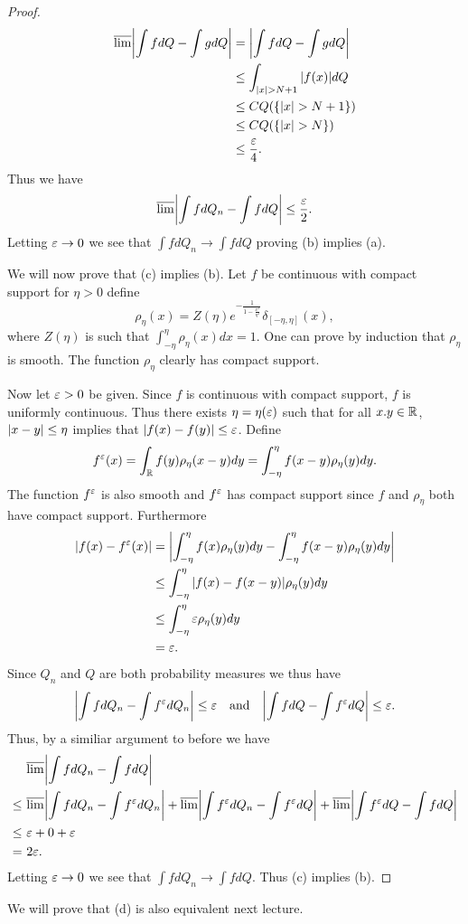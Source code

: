\begin{proof}
\begin{align*}
        \overline{\lim} {\left\lvert\int f dQ - \int g dQ\right\rvert} &= {\left\lvert\int f dQ - \int g dQ\right\rvert}\\
        &\le\int_{{\left\lvert x\right\rvert} > N+1} {\left\lvert f(x)\right\rvert} dQ\\
        &\le C Q(\{{\left\lvert x\right\rvert}>N+1\})\\
        &\le C Q(\{{\left\lvert x\right\rvert}>N\})\\
        &\le \frac{\varepsilon}{4}.
    \end{align*}
    Thus we have 
    \begin{align*}
        \overline{\lim}{\left\lvert\int f dQ_n - \int f dQ\right\rvert}\le \frac{\varepsilon}{2}.
    \end{align*}
    Letting $\varepsilon \to 0$ we see that $\int f dQ_n \to \int f dQ$ proving (b) implies (a).

    We will now prove that (c) implies (b). Let $f$ be continuous with compact support for $\eta > 0$ define
    \[\rho_\eta(x) = Z(\eta)e^{-\frac{1}{1-\frac{x^2}{\eta^2}}}\delta_{[-\eta,\eta]}(x), \]
    where $Z(\eta)$ is such that $\int_{-\eta}^\eta \rho_\eta(x)dx=1$. One can prove by induction that $\rho_\eta$ is smooth. The function $\rho_\eta$ clearly has compact support. 
    
    Now let $\varepsilon > 0$ be given. Since $f$ is continuous with compact support, $f$ is uniformly continuous. Thus there exists $\eta = \eta(\varepsilon)$ such that for all $x. y \in {\mathbb R}$, ${\left\lvert x-y\right\rvert} \le \eta$ implies that ${\left\lvert f(x)-f(y)\right\rvert}\le \varepsilon$. Define
    \[f^\varepsilon(x) = \int_{\mathbb R} f(y)\rho_\eta(x-y)dy = \int_{-\eta}^\eta f(x-y)\rho_\eta(y)dy.\] 
    The function $f^\varepsilon$ is also smooth and $f^\varepsilon$ has compact support since $f$ and $\rho_\eta$ both have compact support. Furthermore 
    \begin{align*}
        {\left\lvert f(x)-f^\varepsilon(x)\right\rvert} & ={\left\lvert\int_{-\eta}^\eta  f(x)\rho_\eta(y)dy-\int_{-\eta}^\eta f(x-y)\rho_\eta(y)dy\right\rvert}\\
        &\le \int_{-\eta}^\eta {\left\lvert f(x)-f(x-y)\right\rvert}\rho_\eta(y)dy\\
        &\le  \int_{-\eta}^\eta\varepsilon \rho_\eta(y)dy\\
        &= \varepsilon.
    \end{align*}
    Since $Q_n$ and $Q$ are both probability measures we thus have 
    \[{\left\lvert\int f dQ_n - \int f^\varepsilon dQ_n \right\rvert} \le \varepsilon~~~\text{and}~~~{\left\lvert\int f dQ - \int f^\varepsilon dQ\right\rvert} \le \varepsilon.\]
    Thus, by a similiar argument to before we have 
    \begin{align*}
        &~\overline{\lim} {\left\lvert\int f dQ_n - \int f dQ\right\rvert}\\
        \le & ~\overline{\lim} {\left\lvert\int f dQ_n - \int f^\varepsilon dQ_n\right\rvert}+\overline{\lim} {\left\lvert\int f^\varepsilon dQ_n - \int f^\varepsilon dQ\right\rvert}+\overline{\lim} {\left\lvert\int f^\varepsilon dQ - \int f dQ\right\rvert}\\
        \le & ~\varepsilon + 0 + \varepsilon \\
        =& ~2\varepsilon.
    \end{align*}
    Letting $\varepsilon \to 0$ we see that $\int fdQ_n \to \int fdQ$. Thus (c) implies (b).
\end{proof}


We will prove that (d) is also equivalent next lecture.

